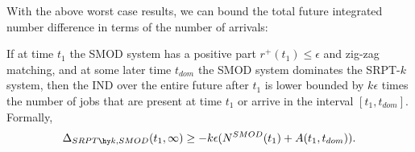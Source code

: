 \documentclass[acmsmall]{acmart}
\begin{document}
With the above worst case results, we can bound the total future integrated number difference in terms of the number of arrivals:

\begin{lemma}
    \label{lem:diff-per-job}
    If at time $t_1$ the SMOD system has a positive part $r^+(t_1) \le \epsilon$ and zig-zag matching,
    and at some later time $t_{dom}$ the SMOD system dominates the SRPT-$k$ system,
    then the IND over the entire future after $t_1$ is lower bounded 
    by $k \epsilon$ times the number of jobs that are present at time $t_1$ or arrive in the interval $[t_1, t_{dom}]$. Formally,
    \begin{align*}
        \Delta_{SRPT\hy k, SMOD}(t_1, \infty) \ge - k \epsilon (N^{SMOD}(t_1) + A(t_1, t_{dom})).
    \end{align*}
\end{lemma}
\end{document}
